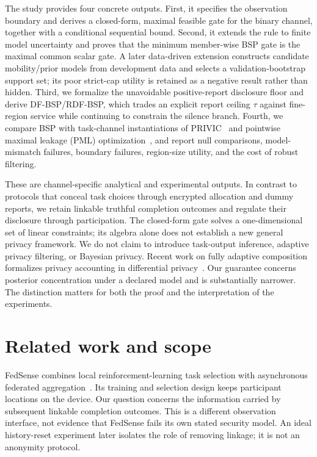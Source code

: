 \documentclass[review,12pt]{elsarticle}
\begin{document}
The study provides four concrete outputs. First, it specifies the observation boundary and derives a closed-form, maximal feasible gate for the binary channel, together with a conditional sequential bound. Second, it extends the rule to finite model uncertainty and proves that the minimum member-wise BSP gate is the maximal common scalar gate. A later data-driven extension constructs candidate mobility/prior models from development data and selects a validation-bootstrap support set; its poor strict-cap utility is retained as a negative result rather than hidden. Third, we formalize the unavoidable positive-report disclosure floor and derive DF-BSP/RDF-BSP, which trades an explicit report ceiling $\tau$ against fine-region service while continuing to constrain the silence branch. Fourth, we compare BSP with task-channel instantiations of PRIVIC~\cite{privic2024} and pointwise maximal leakage (PML) optimization~\cite{pml2024}, and report null comparisons, model-mismatch failures, boundary failures, region-size utility, and the cost of robust filtering.

These are channel-specific analytical and experimental outputs. In contrast to protocols that conceal task choices through encrypted allocation and dummy reports, we retain linkable truthful completion outcomes and regulate their disclosure through participation. The closed-form gate solves a one-dimensional set of linear constraints; its algebra alone does not establish a new general privacy framework. We do not claim to introduce task-output inference, adaptive privacy filtering, or Bayesian privacy. Recent work on fully adaptive composition formalizes privacy accounting in differential privacy~\cite{adaptive2023}. Our guarantee concerns posterior concentration under a declared model and is substantially narrower. The distinction matters for both the proof and the interpretation of the experiments.

\section{Related work and scope}
\label{sec:related}
FedSense combines local reinforcement-learning task selection with asynchronous federated aggregation~\cite{fedsense2025}. Its training and selection design keeps participant locations on the device. Our question concerns the information carried by subsequent linkable completion outcomes. This is a different observation interface, not evidence that FedSense fails its own stated security model. An ideal history-reset experiment later isolates the role of removing linkage; it is not an anonymity protocol.
\end{document}
